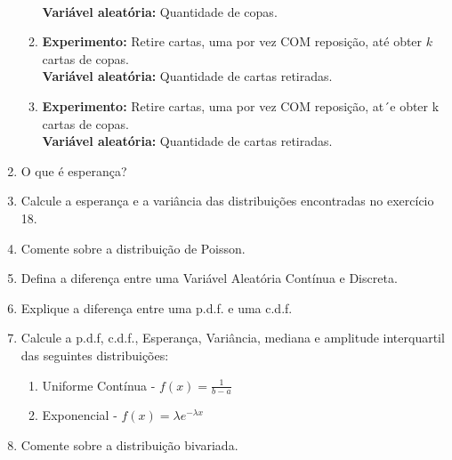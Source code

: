 \documentclass[11pt, a4paper]{article}
\begin{document}
\begin{enumerate}
\begin{enumerate}
	\\\textbf{Variável aleatória:} Quantidade de copas.
	\item \textbf{Experimento:} Retire cartas, uma por vez COM reposição, até obter $k$ cartas de copas.
	\\\textbf{Variável aleatória:} Quantidade de cartas retiradas.
	\item\textbf{Experimento:} Retire cartas, uma por vez COM reposição, at´e obter k cartas de copas.
	\\\textbf{Variável aleatória:} Quantidade de cartas retiradas.
	\end{enumerate}
\item O que é esperança?
\item Calcule a esperança e a variância das distribuições encontradas no exercício 18.
\item Comente sobre a distribuição de Poisson.
\item Defina a diferença entre uma Variável Aleatória Contínua e Discreta.
\item Explique a diferença entre uma p.d.f. e uma c.d.f.
\item Calcule a p.d.f, c.d.f., Esperança, Variância, mediana e amplitude interquartil das seguintes distribuições:
	\begin{enumerate}
	\item Uniforme Contínua - $f(x) = \frac{1}{b-a}$
	\item Exponencial - $f(x)=\lambda e^{-\lambda x}$
	\end{enumerate}
\item Comente sobre a distribuição bivariada.
\end{enumerate}

\end{document}
